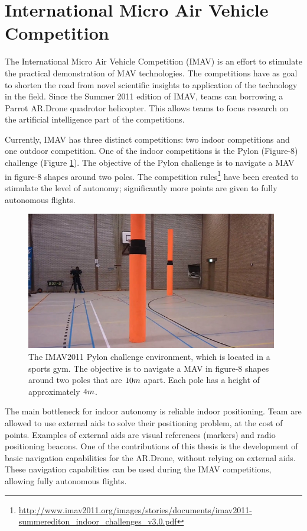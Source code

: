 	\section{International Micro Air Vehicle Competition}
\label{sec:introduction-imav}
The International Micro Air Vehicle Competition (IMAV) is an effort to stimulate the practical demonstration of MAV technologies.
The competitions have as goal to shorten the road from novel scientific insights to application of the technology in the field.
Since the Summer 2011 edition of IMAV, teams can borrowing a Parrot AR.Drone quadrotor helicopter.
This allows teams to focus research on the artificial intelligence part of the competitions.

Currently, IMAV has three distinct competitions: two indoor competitions and one outdoor competition.
One of the indoor competitions is the Pylon (Figure-8) challenge (Figure \ref{fig:imav2011_pylon}).
The objective of the Pylon challenge is to navigate a MAV in figure-8 shapes around two poles.
The competition rules\footnote{\url{http://www.imav2011.org/images/stories/documents/imav2011-summerediton_indoor_challenges_v3.0.pdf}} have been created to stimulate the level of autonomy; significantly more points are given to fully autonomous flights.

\begin{figure}[htb]
\centering
\includegraphics[width=11cm]{images/imav2011_pylon.jpg}
\caption{The IMAV2011 Pylon challenge environment, which is located in a sports gym.
The objective is to navigate a MAV in figure-8 shapes around two poles that are $10\small{m}$ apart. Each pole has a height of approximately $4\small{m}$.}
\label{fig:imav2011_pylon}
\end{figure}

The main bottleneck for indoor autonomy is reliable indoor positioning.
Team are allowed to use external aids to solve their positioning problem, at the cost of points.
Examples of external aids are visual references (markers) and radio positioning beacons.
One of the contributions of this thesis is the development of basic navigation capabilities for the AR.Drone, without relying on external aids.
These navigation capabilities can be used during the IMAV competitions, allowing fully autonomous flights.

